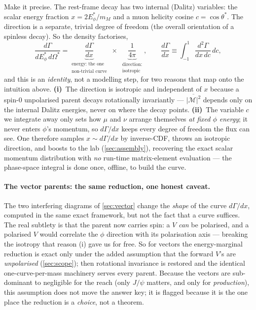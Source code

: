 \documentclass[11pt]{article}
\newcommand{\Ma}{\mathcal{M}}
\begin{document}
Make it precise. The rest-frame decay has two internal (Dalitz) variables: the
scalar energy fraction $x=2E_\phi^*/m_M$ and a muon helicity cosine
$c=\cos\theta^*$. The direction is a separate, trivial degree of freedom (the
overall orientation of a spinless decay). So the density factorises,
\begin{equation}
\frac{d\Gamma}{dE_\phi^*\,d\Omega^*}
=\underbrace{\frac{d\Gamma}{dx}}
  _{\substack{\text{energy: the one}\\\text{non-trivial curve}}}
\;\times\;
\underbrace{\frac{1}{4\pi}}_{\substack{\text{direction:}\\\text{isotropic}}},
\qquad
\frac{d\Gamma}{dx}\equiv\int_{-1}^{1}\frac{d^2\Gamma}{dx\,dc}\,dc ,
\label{eq:factorize}
\end{equation}
and this is an \emph{identity}, not a modelling step, for two reasons that map
onto the intuition above. \textbf{(i)}~The direction is isotropic and independent
of $x$ because a spin-0 unpolarised parent decays rotationally invariantly ---
$\overline{|\Ma|^2}$ depends only on the internal Dalitz energies, never on where
the decay points. \textbf{(ii)}~The variable $c$ we integrate away only sets how
$\mu$ and $\nu$ arrange themselves \emph{at fixed $\phi$ energy}; it never enters
$\phi$'s momentum, so $d\Gamma/dx$ keeps every degree of freedom the flux can
see. One therefore samples $x\sim d\Gamma/dx$ by inverse-CDF, throws an isotropic
direction, and boosts to the lab (\cref{sec:assembly}), recovering the exact
scalar momentum distribution with \emph{no} run-time matrix-element evaluation
--- the phase-space integral is done once, offline, to build the curve.

\paragraph{The vector parents: the same reduction, one honest caveat.} The two
interfering diagrams of \cref{sec:vector} change the \emph{shape} of the curve
$d\Gamma/dx$, computed in the same exact framework, but not the fact that a curve
suffices. The real subtlety is that the parent now carries spin: a $V$ \emph{can}
be polarised, and a polarised $V$ would correlate the $\phi$ direction with its
polarisation axis --- breaking the isotropy that reason (i) gave us for free. So
for vectors the energy-marginal reduction is exact only under the added
assumption that the forward $V$'s are \emph{unpolarised} (\cref{sec:scope}); then
rotational invariance is restored and the identical one-curve-per-mass machinery
serves every parent. Because the vectors are sub-dominant to negligible for the
reach (only $J/\psi$ matters, and only for \emph{production}), this assumption
does not move the answer key; it is flagged because it is the one place the
reduction is a \emph{choice}, not a theorem.
\end{document}
